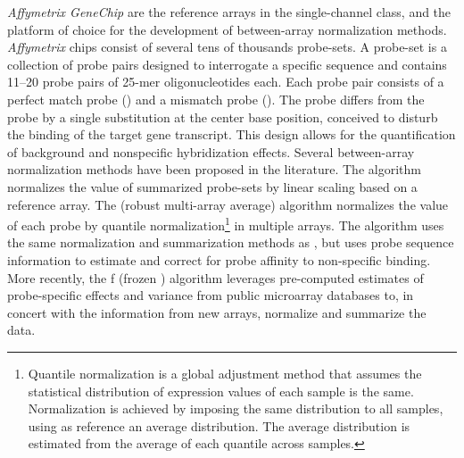 \emph{Affymetrix GeneChip} are the reference arrays in the single-channel class,
and the platform of choice for the development of between-array normalization
methods.  \emph{Affymetrix} chips consist of several tens of thousands
probe-sets.  A probe-set is a collection of probe pairs designed to interrogate
a specific sequence and contains \numrange{11}{20} probe pairs of 25-mer
oligonucleotides each.  Each probe pair consists of a perfect match probe
() and a mismatch probe ().  The 
probe differs from the  probe by a single substitution at the
center base position, conceived to disturb the binding of the target gene
transcript.  This design allows for the quantification of background and
nonspecific hybridization effects.  Several between-array normalization methods
have been proposed in the literature.  The 
algorithm\cite{hubbell_robust_2002} normalizes the value of summarized
probe-sets by linear scaling based on a reference array.  The 
(robust multi-array average) algorithm\cite{irizarry_exploration_2003}
normalizes the value of each probe by quantile normalization\footnote{Quantile
  normalization is a global adjustment method that assumes the statistical
  distribution of expression values of each sample is the same.  Normalization
  is achieved by imposing the same distribution to all samples, using as
  reference an average distribution.  The average distribution is estimated from
  the average of each quantile across samples.} in multiple arrays.  The
 algorithm\cite{wu_model-based_2004} uses the same
normalization and summarization methods as , but uses probe
sequence information to estimate and correct for probe affinity to non-specific
binding.  More recently, the f (frozen )
algorithm\cite{mccall_frozen_2010} leverages pre-computed estimates of
probe-specific effects and variance from public microarray databases to, in
concert with the information from new arrays, normalize and summarize the data.



